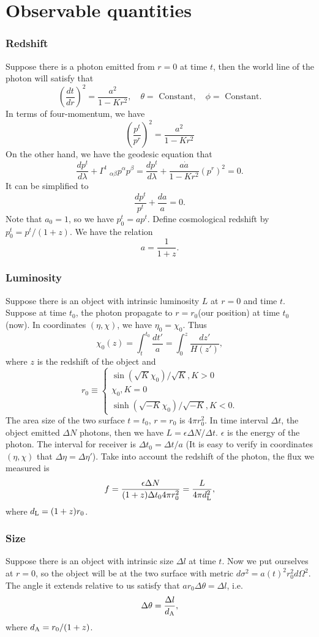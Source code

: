 \section{Observable quantities}
\subsubsection{Redshift}
Suppose there is a photon emitted from $r=0$ at time $t$, then the world line of the photon will satisfy that
\[\left(\frac{dt}{dr}\right)^2 = \frac{a^2}{1-Kr^2}, \quad \theta = \mbox{ Constant}, \quad \phi = \mbox{ Constant}.\]
In terms of four-momentum, we have
\[\left(\frac{p^t}{p^r}\right)^2 = \frac{a^2}{1-Kr^2}\]
On the other hand, we have the geodesic equation that
\[\frac{dp^{t}}{d\lambda} + \Gamma^{t}_{\phantom{*}\alpha \beta} p^{\alpha}p^{\beta} = \frac{dp^{t}}{d\lambda} + \frac{a\dot{a}}{1-Kr^2}(p^r)^2 = 0.\]
It can be simplified to
\[\frac{dp^t}{p^t} + \frac{da}{a} = 0.\]
Note that $a_0 = 1$, so we have $p^t_0 = ap^t$. Define cosmological redshift by $p_0^t = p^t/(1+z)$. We have the relation
\[a = \frac{1}{1+z}.\]

\subsubsection{Luminosity}
Suppose there is an object with intrinsic luminosity $L$ at $r = 0$ and time $t$. Suppose at time $t_0$, the photon propagate to $r = r_0$(our position) at time $t_0$ (now). In coordinates $(\eta,\chi)$, we have $\eta_0 = \chi_0$. Thus
\[\chi_0(z) = \int_{t}^{t_0} \frac{dt'}{a} = \int_{0}^{z} \frac{dz'}{H(z')},\]
where $z$ is the redshift of the object and 
\[r_0 \equiv \begin{cases} 
\sin(\sqrt{K}\chi_0)/\sqrt{K}, K > 0 \\
\chi_0, K = 0 \\
\sinh(\sqrt{-K}\chi_0)/\sqrt{-K}, K < 0.
\end{cases}\]
The area size of the two surface $t=t_0$, $r=r_0$ is $4\pi r_0^2$. In time interval $\Delta t$, the object emitted $\Delta N$ photons, then we have $L = \epsilon \Delta N / \Delta t$. $\epsilon$ is the energy of the photon.
The interval for receiver is $\Delta t_0 = \Delta t / a$ (It is easy to verify in coordinates $(\eta,\chi)$ that $\Delta \eta = \Delta \eta'$). Take into account the redshift of the photon, the flux we measured is
\[f = \frac{\epsilon \Delta N}{(1+z)\Delta t_0 4\pi r_0^2} = \frac{L}{4\pi d_{\rm L}^2},\]
where $d_{\rm L} = (1+z)r_0$.

\subsubsection{Size}
Suppose there is an object with intrinsic size $\Delta l$ at time $t$. Now we put ourselves at $r = 0$, so the object will be at the two surface with metric $d\sigma^2 = a(t)^2 r_0^2 d\Omega^2$. The angle it extends relative to us satisfy that $ar_0\Delta\theta = \Delta l$, i.e.
\[\Delta \theta = \frac{\Delta l}{d_{\rm A}},\]
where $d_{\rm A} = r_0/(1+z)$.